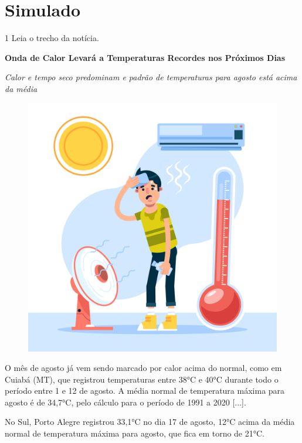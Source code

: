 
\setcounter{chapter}{0}
\chapter[Simulado 1]{Simulado}

\num{1} Leia o trecho da notícia.

\begin{myquote}
\textbf{Onda de Calor Levará a Temperaturas Recordes nos Próximos Dias}

\textit{Calor e tempo seco predominam e padrão de temperaturas para agosto está acima da média}

\begin{figure}
\includegraphics[width=.5\textwidth]{media/image36b.jpeg}
\end{figure}

O mês de agosto já vem sendo marcado por calor acima do normal, como em Cuiabá (MT), que registrou temperaturas entre 38°C e 40°C durante todo o período entre 1 e 12 de agosto. A média normal de temperatura máxima para agosto é de 34,7°C, pelo cálculo para o período de 1991 a 2020 [...].

No Sul, Porto Alegre registrou 33,1°C no dia 17 de agosto, 12°C acima da média normal de temperatura máxima para agosto, que fica em torno de 21°C.

\end{myquote}


